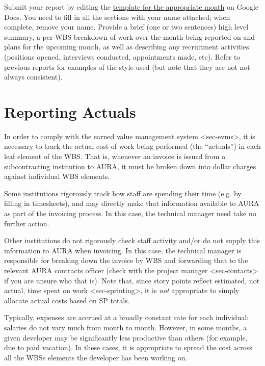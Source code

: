 Submit your report by editing the
\href{https://drive.google.com/drive/u/0/folders/0BxgFbTQURmr6TUJleXZaY2ZNcEE}{template
for the appropriate month} on Google Docs. You need to fill in all the
sections with your name attached; when complete, remove your name.
Provide a brief (one or two sentences) high level summary, a per-WBS
breakdown of work over the month being reported on and plans for the
upcoming month, as well as describing any recruitment activities
(positions opened, interviews conducted, appointments made, etc). Refer
to previous reports for examples of the style used (but note that they
are not not always consistent).

\section{Reporting Actuals}\label{reporting-actuals}

In order to comply with the
earned value management system \textless{}sec-evms\textgreater{}, it is
necessary to track the actual cost of work being performed (the
``actuals'') in each leaf element of the WBS. That is, whenever an
invoice is issued from a subcontracting institution to AURA, it must be
broken down into dollar charges against individual WBS elements.

Some institutions rigorously track how staff are spending their time
(e.g. by filling in timesheets), and may directly make that information
available to AURA as part of the invoicing process. In this case, the
technical manager need take no further action.

Other institutions do not rigorously check staff activity and/or do not
supply this information to AURA when invoicing. In this case, the
technical manager is responsible for breaking down the invoice by WBS
and forwarding that to the relevant AURA contracts officer (check with
the project manager
\textless{}sec-contacts\textgreater{} if you are unsure who that is).
Note that, since
story points reflect estimated, not actual, time spent on work
\textless{}sec-sprinting\textgreater{}, it is \emph{not} appropriate to
simply allocate actual costs based on SP totals.

Typically, expenses are accrued at a broadly constant rate for each
individual: salaries do not vary much from month to month. However, in
some months, a given developer may be significantly less productive than
others (for example, due to paid vacation). In these cases, it is
appropriate to spread the cost across all the WBSs elements the
developer has been working on.

